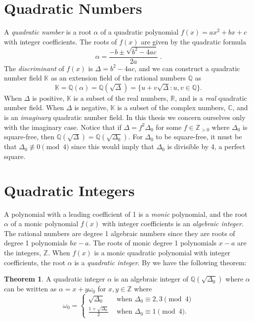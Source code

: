 \documentclass{ucalgthes1}
\theoremstyle{definition}
\newtheorem{thm}{Theorem}[section]
\newcommand{\CC}{\mathbb{C}}
\newcommand{\RR}{\mathbb{R}}
\newcommand{\KK}{\mathbb{K}}
\newcommand{\ZZ}{\mathbb{Z}}
\newcommand{\QQ}{\mathbb{Q}}
\newcommand{\ZZgtz}{\mathbb{Z}_{>0}}
\begin{document}
\section{Quadratic Numbers}

A \emph{quadratic number} is a root $\alpha$ of a quadratic polynomial $f(x) = ax^2 + bx + c$ with integer coefficients. The roots of $f(x)$ are given by the quadratic formula
\[
	\alpha = \frac{-b \pm \sqrt{b^2 - 4ac}}{2a} ~.
\]
The \emph{discriminant} of $f(x)$ is $\Delta = b^2 - 4ac$, and we can construct a quadratic number field $\KK$ as an extension field of the rational numbers $\QQ$ as
\[
	\KK = \QQ(\alpha) = \QQ(\sqrt{\Delta}) = \{u + v\sqrt{\Delta} : u,v \in \QQ\}.
\]
When $\Delta$ is positive, $\KK$ is a subset of the real numbers, $\RR$, and is a \emph{real} quadratic number field. When $\Delta$ is negative, $\KK$ is a subset of the complex numbers, $\CC$, and is an \emph{imaginary} quadratic number field.  In this thesis we concern ourselves only with the imaginary case.  Notice that if $\Delta = f^2 \Delta_0$ for some $f \in \ZZgtz$ where $\Delta_0$ is square-free, then $\QQ(\sqrt{\Delta}) = \QQ(\sqrt{\Delta_0})$. For $\Delta_0$ to be square-free, it must be that $\Delta_0 \not\equiv 0 \pmod 4$ since this would imply that $\Delta_0$ is divisible by 4, a perfect square.  


\bigbreak
\section{Quadratic Integers}

A polynomial with a leading coefficient of 1 is a \emph{monic} polynomial, and the root $\alpha$ of a monic polynomial $f(x)$ with integer coefficients is an \emph{algebraic integer}. The rational numbers are degree 1 algebraic numbers since they are roots of degree 1 polynomials $bx-a$.  The roots of monic degree 1 polynomials $x-a$ are the integers, $\ZZ$.  When $f(x)$ is a monic quadratic polynomial with integer coefficients, the root $\alpha$ is a \emph{quadratic integer}. By \cite[p.77]{Jacobson2009} we have the following theorem:

\begin{thm}
A quadratic integer $\alpha$ is an algebraic integer of $\QQ(\sqrt{\Delta_0})$ where $\alpha$ can be written as $\alpha = x + y \omega_0$ for $x, y \in \ZZ$ where
\begin{equation*}
	\omega_0 = \begin{cases}
		\sqrt{\Delta_0} & \textrm{ when } \Delta_0 \equiv 2, 3 \pmod 4 \\
		\frac{1+\sqrt{\Delta_0}}{2} & \textrm{ when } \Delta_0 \equiv 1 \pmod 4.
	\end{cases}
\end{equation*}
\end{thm}
\end{document}
